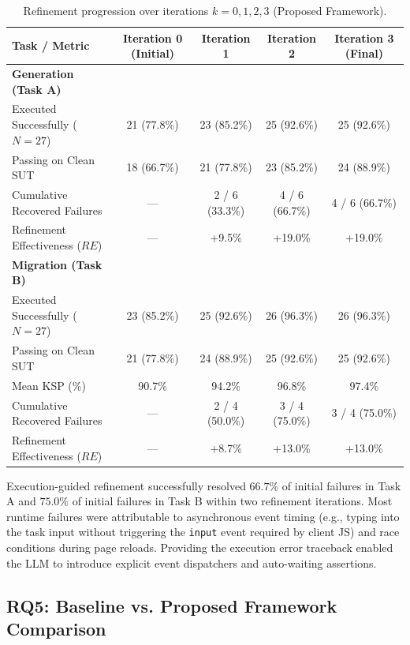 \documentclass[pdflatex,sn-mathphys-num]{sn-jnl}
\begin{document}
\begin{table}[t]
\centering
\caption{Refinement progression over iterations $k = 0, 1, 2, 3$ (Proposed Framework).}
\label{tab:refinement-progression}
\small
\begin{tabular}{lcccc}
\toprule
\textbf{Task / Metric} & \textbf{Iteration 0 (Initial)} & \textbf{Iteration 1} & \textbf{Iteration 2} & \textbf{Iteration 3 (Final)} \\
\midrule
\textbf{Generation (Task A)} & & & & \\
Executed Successfully ($N=27$) & 21 (77.8\%) & 23 (85.2\%) & 25 (92.6\%) & 25 (92.6\%) \\
Passing on Clean SUT & 18 (66.7\%) & 21 (77.8\%) & 23 (85.2\%) & 24 (88.9\%) \\
Cumulative Recovered Failures & --- & 2 / 6 (33.3\%) & 4 / 6 (66.7\%) & 4 / 6 (66.7\%) \\
Refinement Effectiveness ($RE$) & --- & +9.5\% & +19.0\% & +19.0\% \\
\midrule
\textbf{Migration (Task B)} & & & & \\
Executed Successfully ($N=27$) & 23 (85.2\%) & 25 (92.6\%) & 26 (96.3\%) & 26 (96.3\%) \\
Passing on Clean SUT & 21 (77.8\%) & 24 (88.9\%) & 25 (92.6\%) & 25 (92.6\%) \\
Mean KSP (\%) & 90.7\% & 94.2\% & 96.8\% & 97.4\% \\
Cumulative Recovered Failures & --- & 2 / 4 (50.0\%) & 3 / 4 (75.0\%) & 3 / 4 (75.0\%) \\
Refinement Effectiveness ($RE$) & --- & +8.7\% & +13.0\% & +13.0\% \\
\bottomrule
\end{tabular}
\end{table}

Execution-guided refinement successfully resolved $66.7\%$ of initial failures in
Task A and $75.0\%$ of initial failures in Task B within two refinement iterations.
Most runtime failures were attributable to asynchronous event timing (e.g., typing
into the task input without triggering the \texttt{input} event required by client JS)
and race conditions during page reloads. Providing the execution error traceback
enabled the LLM to introduce explicit event dispatchers and auto-waiting assertions.

\subsection{RQ5: Baseline vs. Proposed Framework Comparison}
\label{subsec:rq5-results}
\end{document}
